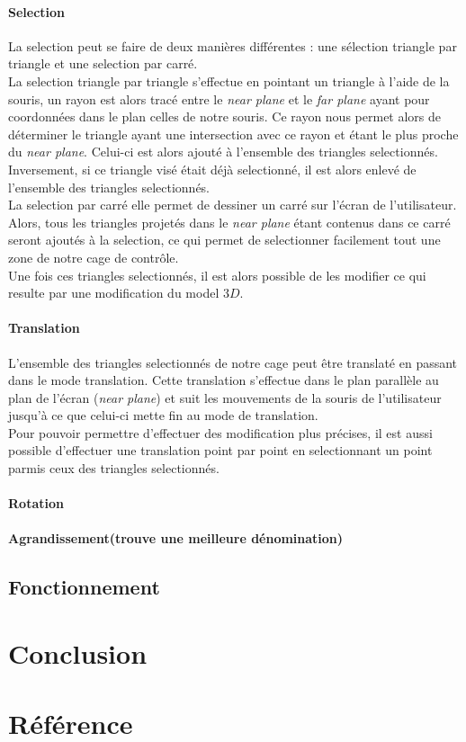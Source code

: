 \documentclass[10pt,a4paper]{article}
\begin{document}
\paragraph{Selection\newline}
La selection peut se faire de deux manières différentes : une sélection triangle par triangle et une selection par carré.\\
La selection triangle par triangle s'effectue en pointant un triangle à l'aide de la souris, un rayon est alors tracé entre le \textit{near plane} et le \textit{far plane} ayant pour coordonnées dans le plan celles de notre souris. Ce rayon nous permet alors de déterminer le triangle ayant une intersection avec ce rayon et étant le plus proche du \textit{near plane}. Celui-ci est alors ajouté à l'ensemble des triangles selectionnés. Inversement, si ce triangle visé était déjà selectionné, il est alors enlevé de l'ensemble des triangles selectionnés.\\
La selection par carré elle permet de dessiner un carré sur l'écran de l'utilisateur. Alors, tous les triangles projetés dans le \textit{near plane} étant contenus dans ce carré seront ajoutés à la selection, ce qui permet de selectionner facilement tout une zone de notre cage de contrôle.\\
Une fois ces triangles selectionnés, il est alors possible de les modifier ce qui resulte par une modification du model $3D$.

\paragraph{Translation\newline}
L'ensemble des triangles selectionnés de notre cage peut être translaté en passant dans le mode translation. Cette translation s'effectue dans le plan parallèle au plan de l'écran (\textit{near plane}) et suit les mouvements de la souris de l'utilisateur jusqu'à ce que celui-ci mette fin au mode de translation.\\
Pour pouvoir permettre d'effectuer des modification plus précises, il est aussi possible d'effectuer une translation point par point en selectionnant un point parmis ceux des triangles selectionnés. 

\paragraph{Rotation\newline}

\paragraph{Agrandissement(trouve une meilleure dénomination)\newline}
\subsection{Fonctionnement}

\section*{Conclusion}

\section*{Référence}




\end{document}
